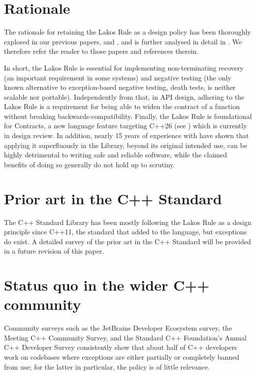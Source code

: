 \section{Rationale}
\label{sec:rationale}

The rationale for retaining the Lakos Rule as a design policy has been thoroughly explored in our previous papers, \cite{P2831R0} and \cite{P2861R0}, and is further analysed in detail in \cite{P3005R0}. We therefore refer the reader to those papers and references therein.

In short, the Lakos Rule is essential for implementing non-terminating recovery (an important requirement in some systems) and negative testing (the only known alternative to exception-based negative testing, death tests, is neither scalable nor portable). Independently from that, in API design, adhering to the Lakos Rule is a requirement for being able to widen the contract of a function without breaking backwards-compatibility. Finally, the Lakos Rule is foundational for Contracts, a new language feature targeting C++26 (see \cite{P2900R5}) which is currently in design review. In addition, nearly 15 years of experience with  have shown that applying it superfluously in the Library, beyond its original intended use, can be highly detrimental to writing safe and reliable software, while the claimed benefits of doing so generally do not hold up to scrutiny.


\section{Prior art in the C++ Standard}
\label{sec:intro}

The C++ Standard Library has been mostly following the Lakos Rule as a design principle since C++11, the standard that added  to the language, but exceptions do exist. A detailed survey of the prior art in the C++ Standard will be provided in a future revision of this paper.


\section{Status quo in the wider C++ community}
\label{sec:intro}

Community surveys such as the JetBrains Developer Ecosystem survey, the Meeting C++ Community Survey, and the Standard C++ Foundation's Annual C++ Developer Survey consistently show that about half of C++ developers work on codebases where exceptions are either partially or completely banned from use; for the latter in particular, the  policy is of little relevance.

